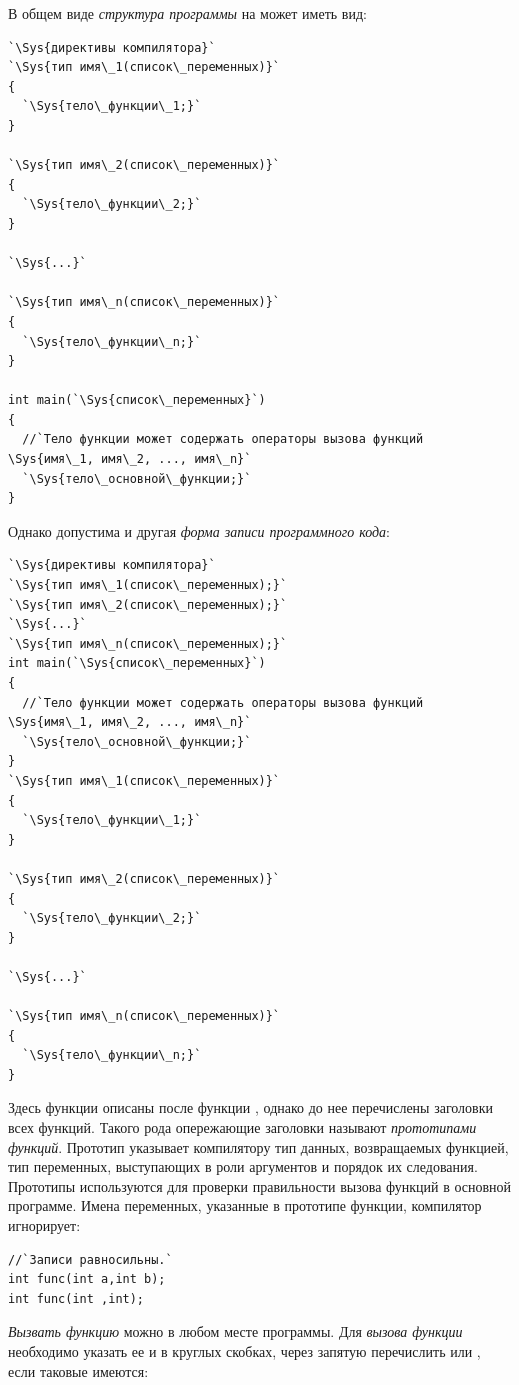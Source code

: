 В общем виде \emph{структура программы} на  может иметь вид:
\begin{lstlisting}
`\Sys{директивы компилятора}`
`\Sys{тип имя\_1(список\_переменных)}`
{
  `\Sys{тело\_функции\_1;}`
}

`\Sys{тип имя\_2(список\_переменных)}`
{
  `\Sys{тело\_функции\_2;}`
}

`\Sys{...}`

`\Sys{тип имя\_n(список\_переменных)}`
{
  `\Sys{тело\_функции\_n;}`
}

int main(`\Sys{список\_переменных}`)
{
  //`Тело функции может содержать операторы вызова функций \Sys{имя\_1, имя\_2, ..., имя\_n}`
  `\Sys{тело\_основной\_функции;}`
}
\end{lstlisting}
Однако допустима и другая \emph{форма записи программного кода}:

\begin{lstlisting}
`\Sys{директивы компилятора}`
`\Sys{тип имя\_1(список\_переменных);}`
`\Sys{тип имя\_2(список\_переменных);}`
`\Sys{...}`
`\Sys{тип имя\_n(список\_переменных);}`
int main(`\Sys{список\_переменных}`)
{
  //`Тело функции может содержать операторы вызова функций \Sys{имя\_1, имя\_2, ..., имя\_n}`
  `\Sys{тело\_основной\_функции;}`
}
`\Sys{тип имя\_1(список\_переменных)}`
{
  `\Sys{тело\_функции\_1;}`
}

`\Sys{тип имя\_2(список\_переменных)}`
{
  `\Sys{тело\_функции\_2;}`
}

`\Sys{...}`

`\Sys{тип имя\_n(список\_переменных)}`
{
  `\Sys{тело\_функции\_n;}`
}
\end{lstlisting}

Здесь функции описаны после функции , однако до нее перечислены заголовки всех функций. Такого
рода опережающие заголовки называют \emph{прототипами
функций}. Прототип указывает компилятору тип данных, возвращаемых функцией, тип переменных,
выступающих в роли аргументов и порядок их следования. Прототипы используются для проверки правильности вызова функций
в основной программе. Имена переменных, указанные в прототипе функции, компилятор игнорирует:
\begin{lstlisting}
//`Записи равносильны.`
int func(int a,int b);
int func(int ,int);
\end{lstlisting}
\emph{Вызвать функцию} можно в любом месте программы. Для \emph{вызова
функции} необходимо указать ее  и в круглых скобках, через запятую перечислить
 или , если таковые имеются:

